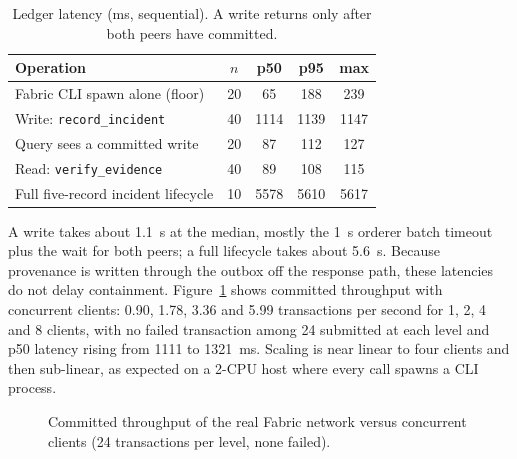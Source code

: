 \documentclass[preprint,12pt]{elsarticle}
\begin{document}
\begin{table}[htbp]
\centering
\caption{Ledger latency (ms, sequential). A write returns only after both peers have committed.}
\label{tab:chainlat}
\small
\begin{tabular}{@{}L{7.2cm}cccc@{}}
\toprule
Operation & $n$ & p50 & p95 & max \\
\midrule
Fabric CLI spawn alone (floor) & 20 & 65 & 188 & 239 \\
Write: \texttt{record\_incident} & 40 & 1114 & 1139 & 1147 \\
Query sees a committed write & 20 & 87 & 112 & 127 \\
Read: \texttt{verify\_evidence} & 40 & 89 & 108 & 115 \\
Full five-record incident lifecycle & 10 & 5578 & 5610 & 5617 \\
\bottomrule
\end{tabular}
\end{table}

A write takes about 1.1~s at the median, mostly the 1~s orderer batch timeout plus the wait for both peers; a full lifecycle takes about 5.6~s. Because provenance is written through the outbox off the response path, these latencies do not delay containment. Figure~\ref{fig:conc} shows committed throughput with concurrent clients: 0.90, 1.78, 3.36 and 5.99 transactions per second for 1, 2, 4 and 8 clients, with no failed transaction among 24 submitted at each level and p50 latency rising from 1111 to 1321~ms. Scaling is near linear to four clients and then sub-linear, as expected on a 2-CPU host where every call spawns a CLI process.

\begin{figure}[htbp]
\centering
{}
\caption{Committed throughput of the real Fabric network versus concurrent clients (24 transactions per level, none failed).}
\label{fig:conc}
\end{figure}
\end{document}
